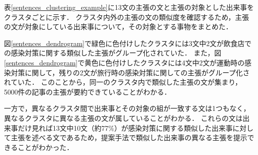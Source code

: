 \documentclass[12pt,a4j]{jreport}
\begin{document}
表\ref{sentences_clustering_example}に13文の主張の文と主張の対象とした出来事をクラスタごとに示す．
クラスタ内外の主張の文の類似度を確認するため，主張の文が対象にしている出来事について，その対象とする事物をまとめた．

図\ref{sentences_dendrogram}で緑色に色付けしたクラスタには3文中2文が飲食店での感染対策に関する類似した主張がグループ化されていた．
また，図\ref{sentences_dendrogram}で黄色に色付けしたクラスタには4文中2文が運動時の感染対策に関して，残りの2文が旅行時の感染対策に関しての主張がグループ化されていた．
このことから，同一のクラスタ内で類似した主張の文が集まり，5000件の記事の主張が要約できていることがわかる．

一方で，異なるクラスタ間で出来事とその対象の組が一致する文は1つもなく，異なるクラスタに異なる主張の文が属していることがわかる．
これらの文は出来事だけ見れば13文中10文（約77\%）が感染対策に関する類似した出来事に対して主張を述べる文であるため，提案手法で類似した出来事の異なる主張を提示できることがわかった．
\end{document}
